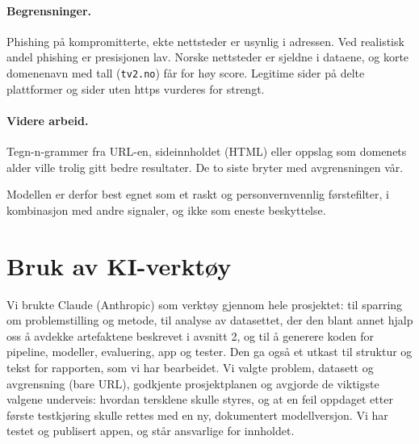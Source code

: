 \documentclass[11pt,a4paper]{article}
\newcommand{\code}[1]{\texttt{#1}}
\begin{document}
\paragraph{Begrensninger.} Phishing på kompromitterte, ekte nettsteder er usynlig i adressen. Ved realistisk andel phishing er presisjonen lav. Norske nettsteder er sjeldne i dataene, og korte domenenavn med tall (\code{tv2.no}) får for høy score. Legitime sider på delte plattformer og sider uten https vurderes for strengt.

\paragraph{Videre arbeid.} Tegn-n-grammer fra URL-en, sideinnholdet (HTML) eller oppslag som domenets alder ville trolig gitt bedre resultater. De to siste bryter med avgrensningen vår.

Modellen er derfor best egnet som et raskt og personvernvennlig førstefilter, i kombinasjon med andre signaler, og ikke som eneste beskyttelse.

\section*{Bruk av KI-verktøy}
Vi brukte Claude (Anthropic) som verktøy gjennom hele prosjektet: til sparring om problemstilling og metode, til analyse av datasettet, der den blant annet hjalp oss å avdekke artefaktene beskrevet i avsnitt 2, og til å generere koden for pipeline, modeller, evaluering, app og tester. Den ga også et utkast til struktur og tekst for rapporten, som vi har bearbeidet. Vi valgte problem, datasett og avgrensning (bare URL), godkjente prosjektplanen og avgjorde de viktigste valgene underveis: hvordan tersklene skulle styres, og at en feil oppdaget etter første testkjøring skulle rettes med en ny, dokumentert modellversjon. Vi har testet og publisert appen, og står ansvarlige for innholdet.
\end{document}
